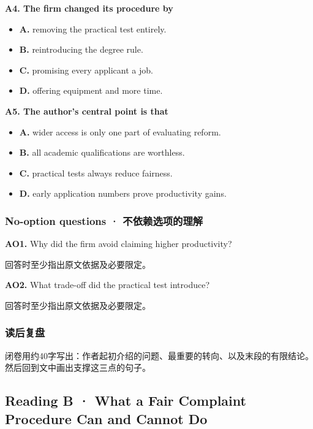\documentclass[
  11pt,
]{ctexart}
\begin{document}
\textbf{A4. The firm changed its procedure by}

\begin{itemize}
\item
  \textbf{A.} removing the practical test entirely.
\item
  \textbf{B.} reintroducing the degree rule.
\item
  \textbf{C.} promising every applicant a job.
\item
  \textbf{D.} offering equipment and more time.
\end{itemize}

\textbf{A5. The author's central point is that}

\begin{itemize}
\item
  \textbf{A.} wider access is only one part of evaluating reform.
\item
  \textbf{B.} all academic qualifications are worthless.
\item
  \textbf{C.} practical tests always reduce fairness.
\item
  \textbf{D.} early application numbers prove productivity gains.
\end{itemize}

\subsubsection{No-option questions ·
不依赖选项的理解}\label{no-option-questions-ux4e0dux4f9dux8d56ux9009ux9879ux7684ux7406ux89e3}

\textbf{AO1.} Why did the firm avoid claiming higher productivity?

回答时至少指出原文依据及必要限定。

\textbf{AO2.} What trade-off did the practical test introduce?

回答时至少指出原文依据及必要限定。

\subsubsection{读后复盘}\label{ux8bfbux540eux590dux76d8}

闭卷用约40字写出：作者起初介绍的问题、最重要的转向、以及末段的有限结论。然后回到文中画出支撑这三点的句子。

\subsection{Reading B · What a Fair Complaint Procedure Can and Cannot
Do}\label{reading-b-what-a-fair-complaint-procedure-can-and-cannot-do}
\end{document}
